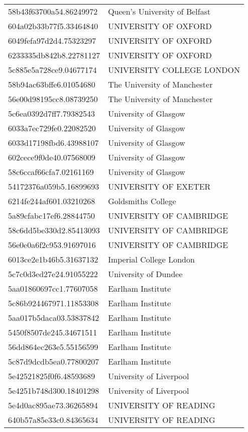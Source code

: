 \begin{tabular}{ll}
58b43f63700a54.86249972 & Queen's University of Belfast \\
604a02b33b77f5.33464840 & UNIVERSITY OF OXFORD \\
6049fefa97d2d4.75323297 & UNIVERSITY OF OXFORD \\
6233335db842b8.22781127 & UNIVERSITY OF OXFORD \\
5c885e5a728ce9.04677174 & UNIVERSITY COLLEGE LONDON \\
58b94ac63bffe6.01054680 & The University of Manchester \\
56e00d98195cc8.08739250 & The University of Manchester \\
5c6ea0392d7ff7.79382543 & University of Glasgow \\
6033a7ec729fe0.22082520 & University of Glasgow \\
6033d17198fbd6.43988107 & University of Glasgow \\
602cece9f0de40.07568009 & University of Glasgow \\
58c6ccaf66cfa7.02161169 & University of Glasgow \\
54172376a059b5.16899693 & UNIVERSITY OF EXETER \\
6214fe244af601.03210268 & Goldsmiths College \\
5a89cfabc17ef6.28844750 & UNIVERSITY OF CAMBRIDGE \\
58c6dd5be330d2.85413093 & UNIVERSITY OF CAMBRIDGE \\
56e0e0a6f2c953.91697016 & UNIVERSITY OF CAMBRIDGE \\
6013ce2e1b46b5.31637132 & Imperial College London \\
5c7c0d3ed27e24.91055222 & University of Dundee \\
5aa01860697cc1.77607058 & Earlham Institute \\
5c86b924467971.11853308 & Earlham Institute \\
5aa017b5daca03.53837842 & Earlham Institute \\
5450f8507de245.34671511 & Earlham Institute \\
56dd864ec263e5.55156599 & Earlham Institute \\
5c87d9dcdb5ea0.77800207 & Earlham Institute \\
5e42521825f0f6.48593689 & University of Liverpool \\
5e4251b748d300.18401298 & University of Liverpool \\
5e4d0ac895ae73.36265894 & UNIVERSITY OF READING \\
640b57a85e33c0.84365634 & UNIVERSITY OF READING \\

\end{tabular}

